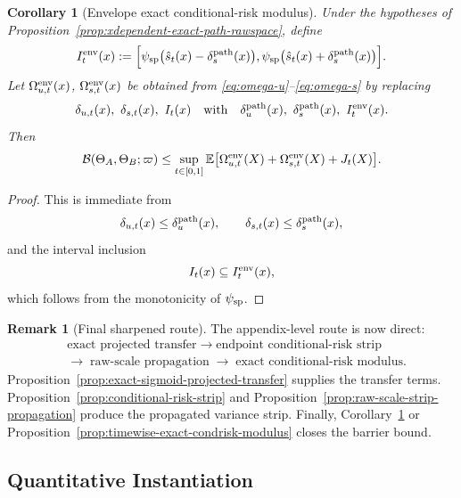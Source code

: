 \documentclass[11pt]{article}
\newtheorem{corollary}[theorem]{Corollary}
\theoremstyle{definition}
\newtheorem{remark}[theorem]{Remark}
\newcommand{\E}{\mathbb{E}}
\newcommand{\cB}{\mathcal{B}}
\begin{document}
\begin{corollary}[Envelope exact conditional-risk modulus]
\label{cor:envelope-exact-condrisk-modulus}
Under the hypotheses of
Proposition~\ref{prop:xdependent-exact-path-rawspace}, define
\[
  I_t^{\rm env}(x)
  :=
  \Bigl[
    \psi_{\rm sp}\bigl(\hat s_t(x)-\delta_s^{\rm path}(x)\bigr),
    \psi_{\rm sp}\bigl(\hat s_t(x)+\delta_s^{\rm path}(x)\bigr)
  \Bigr].
\]
Let $\Omega^{\rm env}_{u,t}(x)$, $\Omega^{\rm env}_{s,t}(x)$ be obtained from
\eqref{eq:omega-u}--\eqref{eq:omega-s} by replacing
\[
  \delta_{u,t}(x),\ \delta_{s,t}(x),\ I_t(x)
  \quad\text{with}\quad
  \delta_u^{\rm path}(x),\ \delta_s^{\rm path}(x),\ I_t^{\rm env}(x).
\]
Then
\begin{equation}
  \cB(\Theta_A,\Theta_B;\varpi)
  \le
  \sup_{t\in[0,1]}
  \E\bigl[
    \Omega^{\rm env}_{u,t}(X)
    +
    \Omega^{\rm env}_{s,t}(X)
    +
    J_t(X)
  \bigr].
  \label{eq:envelope-exact-condrisk-modulus}
\end{equation}
\end{corollary}

\begin{proof}
This is immediate from
\[
  \delta_{u,t}(x)\le\delta_u^{\rm path}(x),
  \qquad
  \delta_{s,t}(x)\le\delta_s^{\rm path}(x),
\]
and the interval inclusion
\[
  I_t(x)\subseteq I_t^{\rm env}(x),
\]
which follows from the monotonicity of $\psi_{\rm sp}$.
\end{proof}

\begin{remark}[Final sharpened route]
The appendix-level route is now direct:
\begin{align*}
  &\text{exact projected transfer}
  \;\to\;
  \text{endpoint conditional-risk strip}
  \\
  &\to\;
  \text{raw-scale propagation}
  \;\to\;
  \text{exact conditional-risk modulus}.
\end{align*}
Proposition~\ref{prop:exact-sigmoid-projected-transfer} supplies the transfer
terms. Proposition~\ref{prop:conditional-risk-strip} and
Proposition~\ref{prop:raw-scale-strip-propagation} produce the propagated
variance strip. Finally,
Corollary~\ref{cor:envelope-exact-condrisk-modulus} or
Proposition~\ref{prop:timewise-exact-condrisk-modulus} closes the barrier
bound.
\end{remark}

\subsection{Quantitative Instantiation}
\end{document}

